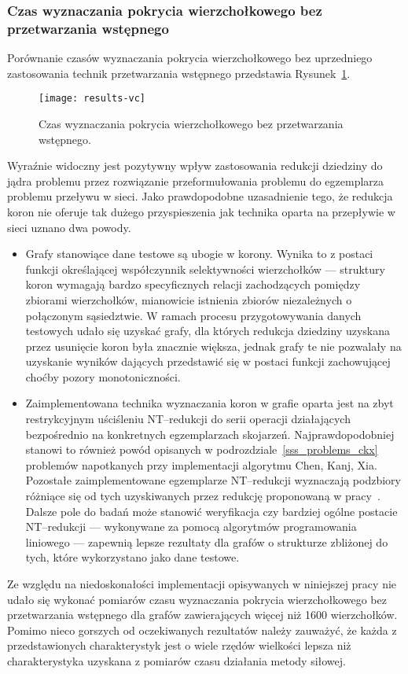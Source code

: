 \subsubsection{\textbf{Czas wyznaczania pokrycia wierzchołkowego bez przetwarzania wstępnego}}\label{time_vc}
\par{
  Porównanie czasów wyznaczania pokrycia wierzchołkowego bez uprzedniego zastosowania technik przetwarzania wstępnego przedstawia Rysunek~\ref{fig_results_vc}.
  \begin{figure}
    \caption{Czas wyznaczania pokrycia wierzchołkowego bez przetwarzania wstępnego.}
    \label{fig_results_vc}
    \centering
      \texttt{[image: results-vc]}
  \end{figure}
  Wyraźnie widoczny jest pozytywny wpływ zastosowania redukcji dziedziny do jądra problemu przez rozwiązanie przeformułowania problemu do egzemplarza problemu przeływu w sieci.
  Jako prawdopodobne uzasadnienie tego, że redukcja koron nie oferuje tak dużego przyspieszenia jak technika oparta na przepływie w sieci uznano dwa powody.
  \begin{itemize}
    \item Grafy stanowiące dane testowe są ubogie w korony.
    Wynika to z postaci funkcji określającej współczynnik selektywności wierzchołków --- struktury koron wymagają bardzo specyficznych relacji zachodzących pomiędzy zbiorami wierzchołków, mianowicie istnienia zbiorów niezależnych o połączonym sąsiedztwie.
    W ramach procesu przygotowywania danych testowych udało się uzyskać grafy, dla których redukcja dziedziny uzyskana przez usunięcie koron była znacznie większa, jednak grafy te nie pozwalały na uzyskanie wyników dających przedstawić się w postaci funkcji zachowującej choćby pozory monotoniczności.
    \item Zaimplementowana technika wyznaczania koron w grafie oparta jest na zbyt restrykcyjnym uściśleniu NT--redukcji do serii operacji działających bezpośrednio na konkretnych egzemplarzach skojarzeń.
    Najprawdopodobniej stanowi to również powód opisanych w podrozdziale~\ref{sss_problems_ckx} problemów napotkanych przy implementacji algorytmu Chen, Kanj, Xia.
    Pozostałe zaimplementowane egzemplarze NT--redukcji wyznaczają podzbiory różniące się od tych uzyskiwanych przez redukcję proponowaną w pracy~\cite{KernelizationAlgorithms04}.
    Dalsze pole do badań może stanowić weryfikacja czy bardziej ogólne postacie NT--redukcji --- wykonywane za pomocą algorytmów programowania liniowego --- zapewnią lepsze rezultaty dla grafów o strukturze zbliżonej do tych, które wykorzystano jako dane testowe.
  \end{itemize}

  Ze względu na niedoskonałości implementacji opisywanych w niniejszej pracy nie udało się wykonać pomiarów czasu wyznaczania pokrycia wierzchołkowego bez przetwarzania wstępnego dla grafów zawierających więcej niż 1600 wierzchołków.
  Pomimo nieco gorszych od oczekiwanych rezultatów należy zauważyć, że każda z przedstawionych charakterystyk jest o wiele rzędów wielkości lepsza niż charakterystyka uzyskana z pomiarów czasu działania metody siłowej.
}
